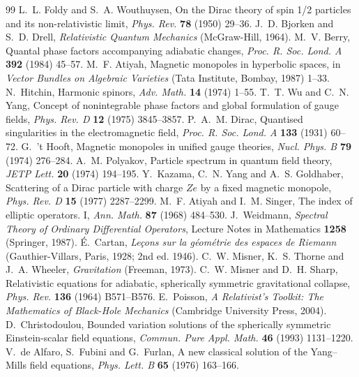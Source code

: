 \begin{thebibliography}{99}
 L.~L. Foldy and S.~A. Wouthuysen, On the Dirac theory of spin 1/2 particles and its non-relativistic limit, \emph{Phys. Rev.} \textbf{78} (1950) 29--36.
 J.~D. Bjorken and S.~D. Drell, \emph{Relativistic Quantum Mechanics} (McGraw-Hill, 1964).
 M.~V. Berry, Quantal phase factors accompanying adiabatic changes, \emph{Proc. R. Soc. Lond. A} \textbf{392} (1984) 45--57.
 M.~F. Atiyah, Magnetic monopoles in hyperbolic spaces, in \emph{Vector Bundles on Algebraic Varieties} (Tata Institute, Bombay, 1987) 1--33.
 N.~Hitchin, Harmonic spinors, \emph{Adv. Math.} \textbf{14} (1974) 1--55.
 T.~T. Wu and C.~N. Yang, Concept of nonintegrable phase factors and global formulation of gauge fields, \emph{Phys. Rev. D} \textbf{12} (1975) 3845--3857.
 P.~A.~M. Dirac, Quantised singularities in the electromagnetic field, \emph{Proc. R. Soc. Lond. A} \textbf{133} (1931) 60--72.
 G.~'t Hooft, Magnetic monopoles in unified gauge theories, \emph{Nucl. Phys. B} \textbf{79} (1974) 276--284.
 A.~M. Polyakov, Particle spectrum in quantum field theory, \emph{JETP Lett.} \textbf{20} (1974) 194--195.
 Y.~Kazama, C.~N. Yang and A.~S. Goldhaber, Scattering of a Dirac particle with charge $Ze$ by a fixed magnetic monopole, \emph{Phys. Rev. D} \textbf{15} (1977) 2287--2299.
 M.~F. Atiyah and I.~M. Singer, The index of elliptic operators. I, \emph{Ann. Math.} \textbf{87} (1968) 484--530.
 J.~Weidmann, \emph{Spectral Theory of Ordinary Differential Operators}, Lecture Notes in Mathematics \textbf{1258} (Springer, 1987).
 \'E.~Cartan, \emph{Le\c{c}ons sur la g\'eom\'etrie des espaces de Riemann} (Gauthier-Villars, Paris, 1928; 2nd ed. 1946).
 C.~W. Misner, K.~S. Thorne and J.~A. Wheeler, \emph{Gravitation} (Freeman, 1973).
 C.~W. Misner and D.~H. Sharp, Relativistic equations for adiabatic, spherically symmetric gravitational collapse, \emph{Phys. Rev.} \textbf{136} (1964) B571--B576.
 E.~Poisson, \emph{A Relativist's Toolkit: The Mathematics of Black-Hole Mechanics} (Cambridge University Press, 2004).
 D.~Christodoulou, Bounded variation solutions of the spherically symmetric Einstein-scalar field equations, \emph{Commun. Pure Appl. Math.} \textbf{46} (1993) 1131--1220.
 V.~de Alfaro, S.~Fubini and G.~Furlan, A new classical solution of the Yang--Mills field equations, \emph{Phys. Lett. B} \textbf{65} (1976) 163--166.

\end{thebibliography}
